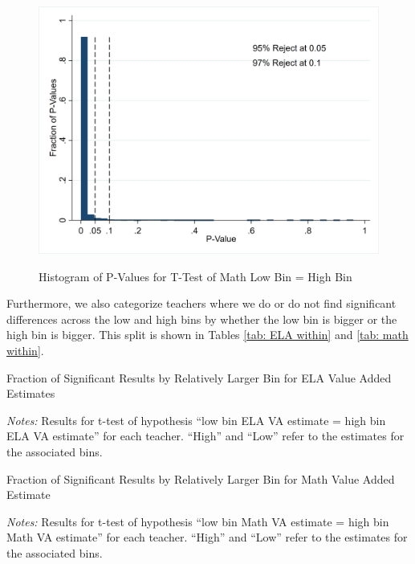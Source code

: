 \documentclass[letterpaper,12pt]{article}
\begin{document}
\begin{figure}[ht]
    \centering
    \caption{Histogram of P-Values for T-Test of Math Low Bin = High Bin}
    \includegraphics[width=.\textwidth]{figures/Math_T_Test_Hist.png}
    \label{fig: math ttest}
\end{figure}

Furthermore, we also categorize teachers where we do or do not find significant differences across the low and high bins by whether the low bin is bigger or the high bin is bigger. This split is shown in Tables \ref{tab: ELA within} and \ref{tab: math within}.

\begin{table}[ht]
    \centering
    \caption{Fraction of Significant Results by Relatively Larger Bin for ELA Value Added Estimates}
    
    \label{tab: ELA within}
    \caption*{\scriptsize \textit{Notes:} Results for t-test of hypothesis ``low bin ELA VA estimate = high bin ELA VA estimate'' for each teacher. ``High'' and ``Low'' refer to the estimates for the associated bins.}
\end{table}


\begin{table}[ht]
    \centering
    \caption{Fraction of Significant Results by Relatively Larger Bin for Math Value Added Estimate}
    
    \label{tab: math within}
    \caption*{\scriptsize \textit{Notes:} Results for t-test of hypothesis ``low bin Math VA estimate = high bin Math VA estimate'' for each teacher. ``High'' and ``Low'' refer to the estimates for the associated bins.}
\end{table}
\end{document}
